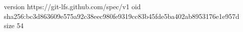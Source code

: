 version https://git-lfs.github.com/spec/v1
oid sha256:bc3d863609e575a92c38eec980fe9319cc83b45fde5ba402ab8953176e1e957d
size 54
